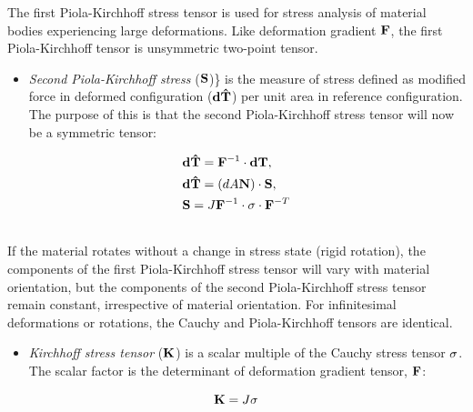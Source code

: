 \documentclass[letterpaper,10pt,english]{sphinxmanual}
\begin{document}
The first Piola-Kirchhoff stress tensor is used for stress analysis of material bodies experiencing large deformations. Like deformation gradient ${\bf F}$, the first Piola-Kirchhoff tensor is unsymmetric two-point tensor.
\begin{itemize}
\item {} 
\emph{Second Piola-Kirchhoff stress} (${\bf S}$)\} is the measure of stress defined as modified force in deformed configuration (${\bf d\hat T}$) per unit area in reference configuration. The purpose of this is that the second Piola-Kirchhoff stress tensor will now be a symmetric tensor:

\end{itemize}
\label{general:equation-eq:eqstress6}\begin{gather}
\begin{split}\begin{split}
&{\bf d\hat T} = {\bf F}^{-1} \cdot {\bf dT}, \\
&{\bf d\hat T} = (dA{\bf N}) \cdot {\bf S}, \\
&{\bf S} = J {\bf F}^{-1} \cdot {\bf \sigma} \cdot {\bf F}^{-T}
\end{split}\end{split}\label{general-eq:eqstress6}\\\begin{split}\end{split}\notag
\end{gather}
If the material rotates without a change in stress state (rigid rotation), the components of the first Piola-Kirchhoff stress tensor will vary with material orientation, but the components of the second Piola-Kirchhoff stress tensor remain constant, irrespective of material orientation. For infinitesimal deformations or rotations, the Cauchy and Piola-Kirchhoff tensors are identical.
\begin{itemize}
\item {} 
\emph{Kirchhoff stress tensor} (${\bf K}$) is a scalar multiple of the Cauchy stress tensor ${\bf \sigma}$. The scalar factor is the determinant of deformation gradient tensor, ${\bf F}$:

\end{itemize}
\label{general:equation-eq:eqstress7}\begin{gather}
\begin{split}{\bf K} = J {\bf \sigma}\end{split}\label{general-eq:eqstress7}\\\begin{split}\end{split}\notag
\end{gather}
\end{document}
